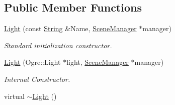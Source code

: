 \subsection*{Public Member Functions}
\begin{DoxyCompactItemize}
\item 
\hyperlink{classphys_1_1Light_a4bcb13aaf1ab92e7df71b565eeec61e4}{Light} (const \hyperlink{namespacephys_aa03900411993de7fbfec4789bc1d392e}{String} \&Name, \hyperlink{classphys_1_1SceneManager}{SceneManager} $\ast$manager)
\begin{DoxyCompactList}\small\item\em Standard initialization constructor. \item\end{DoxyCompactList}\item 
\hyperlink{classphys_1_1Light_a27cfdf1933c6b0054aa4ef8348f56daa}{Light} (Ogre::Light $\ast$light, \hyperlink{classphys_1_1SceneManager}{SceneManager} $\ast$manager)
\begin{DoxyCompactList}\small\item\em Internal Constructor. \item\end{DoxyCompactList}\item 
\hypertarget{classphys_1_1Light_a0ee3882bb8e1e613bd88380a9681af2e}{
virtual \hyperlink{classphys_1_1Light_a0ee3882bb8e1e613bd88380a9681af2e}{$\sim$Light} ()}
\label{dc/df1/classphys_1_1Light_a0ee3882bb8e1e613bd88380a9681af2e}


\end{DoxyCompactItemize}
